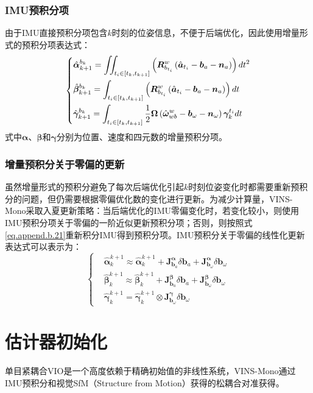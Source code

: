 \subsubsection{IMU预积分项}
由于IMU直接预积分项包含$k$时刻的位姿信息，不便于后端优化，因此使用增量形式的预积分项表达式：
\begin{equation}
\centering
\left\{
\begin{aligned}
&\hat{\bm{\alpha}}_{k+1}^{b_k}=\iint_{t_i\in\left[t_k,t_{k+1}\right]}\left(\bm{R}_{b_{t_i}}^w\left(\hat{\bm{a}}_{t_i}-\bm{b}_a-\bm{n}_a\right)\right)dt^2\\
&\hat{\bm{\beta}}_{k+1}^{b_k}=\int_{t_i\in\left[t_k,t_{k+1}\right]}\left(\bm{R}_{b_{t_i}}^w\left(\hat{\bm{a}}_{t_i}-\bm{b}_a-\bm{n}_a\right)\right)dt\\
&\hat{\bm{\gamma}}_{k+1}^{b_k}=\int_{t_i\in\left[t_k,t_{k+1}\right]}\frac{1}{2}\bm{\Omega}\left(\hat{\bm{\omega}}_{wb}^w-\bm{b}_\omega-\bm{n}_\omega\right)\bm{\gamma}_k^{t_i}dt
\end{aligned}
\right.
\end{equation}
式中$\bm{\alpha}$、$\bm{\beta}$和$\bm{\gamma}$分别为位置、速度和四元数的增量预积分项。
\subsubsection{增量预积分关于零偏的更新}
虽然增量形式的预积分避免了每次后端优化引起$k$时刻位姿变化时都需要重新预积分的问题，但仍需要根据零偏优化数的变化进行更新。为减少计算量，VINS-Mono采取入夏更新策略：当后端优化的IMU零偏变化时，若变化较小，则使用IMU预积分项关于零偏的一阶近似更新预积分项；否则，则按照式\ref{eq.append.b.21}重新积分IMU得到预积分项。IMU预积分关于零偏的线性化更新表达式可以表示为：
\begin{equation}
\left\{
\begin{aligned}
&\hat{\bm{\alpha}}_k^{k+1}\approx\hat{\bm{\alpha}}_k^{k+1}+\bm{J}^{\bm{\alpha}}_{\bm{b}_a}\delta\bm{b}_a+\bm{J}^{\bm{\alpha}}_{\bm{b}_\omega}\delta\bm{b}_\omega\\
&\hat{\bm{\beta}}_k^{k+1}\approx\hat{\bm{\beta}}_k^{k+1}+\bm{J}^{\bm{\beta}}_{\bm{b}_a}\delta\bm{b}_a+\bm{J}^{\bm{\beta}}_{\bm{b}_\omega}\delta\bm{b}_\omega\\
&\hat{\bm{\gamma}}_k^{k+1}=\hat{\bm{\gamma}}_k^{k+1}\otimes\bm{J}^{\bm{\gamma}}_{\bm{b}_\omega}\delta\bm{b}_\omega
\end{aligned}
\right.
\label{eq.2.4}
\end{equation}
\section{估计器初始化}
单目紧耦合VIO是一个高度依赖于精确初始值的非线性系统，VINS-Mono通过IMU预积分和视觉SfM（Structure from Motion）获得的松耦合对准获得。
